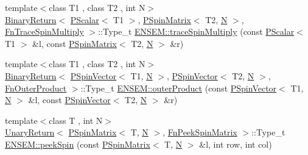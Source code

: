 \begin{DoxyCompactItemize}
\item 
{\footnotesize template$<$class T1 , class T2 , int N$>$ }\\\mbox{\hyperlink{structENSEM_1_1BinaryReturn}{Binary\+Return}}$<$ \mbox{\hyperlink{classENSEM_1_1PScalar}{P\+Scalar}}$<$ T1 $>$, \mbox{\hyperlink{classENSEM_1_1PSpinMatrix}{P\+Spin\+Matrix}}$<$ T2, \mbox{\hyperlink{adat__devel_2lib_2hadron_2operator__name__util_8cc_a7722c8ecbb62d99aee7ce68b1752f337}{N}} $>$, \mbox{\hyperlink{structENSEM_1_1FnTraceSpinMultiply}{Fn\+Trace\+Spin\+Multiply}} $>$\+::Type\+\_\+t \mbox{\hyperlink{group__primspinmatrix_ga2dc2ab87ff63abab3c74a0a1f1dd3d09}{E\+N\+S\+E\+M\+::trace\+Spin\+Multiply}} (const \mbox{\hyperlink{classENSEM_1_1PScalar}{P\+Scalar}}$<$ T1 $>$ \&l, const \mbox{\hyperlink{classENSEM_1_1PSpinMatrix}{P\+Spin\+Matrix}}$<$ T2, \mbox{\hyperlink{adat__devel_2lib_2hadron_2operator__name__util_8cc_a7722c8ecbb62d99aee7ce68b1752f337}{N}} $>$ \&r)
\item 
{\footnotesize template$<$class T1 , class T2 , int N$>$ }\\\mbox{\hyperlink{structENSEM_1_1BinaryReturn}{Binary\+Return}}$<$ \mbox{\hyperlink{classENSEM_1_1PSpinVector}{P\+Spin\+Vector}}$<$ T1, \mbox{\hyperlink{adat__devel_2lib_2hadron_2operator__name__util_8cc_a7722c8ecbb62d99aee7ce68b1752f337}{N}} $>$, \mbox{\hyperlink{classENSEM_1_1PSpinVector}{P\+Spin\+Vector}}$<$ T2, \mbox{\hyperlink{adat__devel_2lib_2hadron_2operator__name__util_8cc_a7722c8ecbb62d99aee7ce68b1752f337}{N}} $>$, \mbox{\hyperlink{structENSEM_1_1FnOuterProduct}{Fn\+Outer\+Product}} $>$\+::Type\+\_\+t \mbox{\hyperlink{group__primspinmatrix_ga6ff39d20fc8369664c9b3849e00d654d}{E\+N\+S\+E\+M\+::outer\+Product}} (const \mbox{\hyperlink{classENSEM_1_1PSpinVector}{P\+Spin\+Vector}}$<$ T1, \mbox{\hyperlink{adat__devel_2lib_2hadron_2operator__name__util_8cc_a7722c8ecbb62d99aee7ce68b1752f337}{N}} $>$ \&l, const \mbox{\hyperlink{classENSEM_1_1PSpinVector}{P\+Spin\+Vector}}$<$ T2, \mbox{\hyperlink{adat__devel_2lib_2hadron_2operator__name__util_8cc_a7722c8ecbb62d99aee7ce68b1752f337}{N}} $>$ \&r)
\item 
{\footnotesize template$<$class T , int N$>$ }\\\mbox{\hyperlink{structENSEM_1_1UnaryReturn}{Unary\+Return}}$<$ \mbox{\hyperlink{classENSEM_1_1PSpinMatrix}{P\+Spin\+Matrix}}$<$ T, \mbox{\hyperlink{adat__devel_2lib_2hadron_2operator__name__util_8cc_a7722c8ecbb62d99aee7ce68b1752f337}{N}} $>$, \mbox{\hyperlink{structENSEM_1_1FnPeekSpinMatrix}{Fn\+Peek\+Spin\+Matrix}} $>$\+::Type\+\_\+t \mbox{\hyperlink{group__primspinmatrix_ga2af6db806ff17a39ca84960a216d33c7}{E\+N\+S\+E\+M\+::peek\+Spin}} (const \mbox{\hyperlink{classENSEM_1_1PSpinMatrix}{P\+Spin\+Matrix}}$<$ T, \mbox{\hyperlink{adat__devel_2lib_2hadron_2operator__name__util_8cc_a7722c8ecbb62d99aee7ce68b1752f337}{N}} $>$ \&l, int row, int col)

\end{DoxyCompactItemize}
